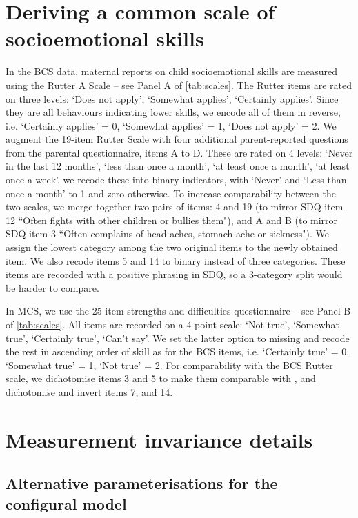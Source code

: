 
\section{Deriving a common scale of socioemotional skills}\label{asec:scales}

In the BCS data, maternal reports on child socioemotional skills are measured using the Rutter A Scale \citep{Rutter1970} -- see Panel A of \autoref{tab:scales}. The Rutter items are rated on three levels: `Does not apply', `Somewhat applies', `Certainly applies'. Since they are all behaviours indicating lower skills, we encode all of them in reverse, i.e. `Certainly applies' = 0, `Somewhat applies' = 1, `Does not apply' = 2. We augment the 19-item Rutter Scale with four additional parent-reported questions from the parental questionnaire, items A to D. These are rated on 4 levels: `Never in the last 12 months', `less than once a month', `at least once a month', `at least once a week'. we recode these into binary indicators, with `Never' and `Less than once a month' to 1 and zero otherwise. To increase comparability between the two scales, we merge together two pairs of items: 4 and 19 (to mirror SDQ item 12 ``Often fights with other children or bullies them"), and A and B (to mirror SDQ item 3 ``Often complains of head-aches, stomach-ache or sickness"). We assign the lowest category among the two original items to the newly obtained item. We also recode items 5 and 14 to binary instead of three categories. These items are recorded with a positive phrasing in SDQ, so a 3-category split would be harder to compare.

In MCS, we use the 25-item strengths and difficulties questionnaire \citep{Goodman1997} -- see Panel B of \autoref{tab:scales}. All items are recorded on a 4-point scale: `Not true', `Somewhat true', `Certainly true', `Can't say'. We set the latter option to missing and recode the rest in ascending order of skill as for the BCS items, i.e. `Certainly true' = 0, `Somewhat true' = 1, `Not true' = 2. For comparability with the BCS Rutter scale, we dichotomise items 3 and 5 to make them comparable with , and dichotomise and invert items 7, and 14.


\section{Measurement invariance details}\label{asec:midet}

\subsection{Alternative parameterisations for the configural model}

